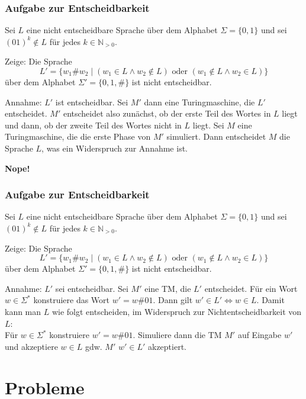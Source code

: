 

\begin{frame}
	\frametitle{Aufgabe zur Entscheidbarkeit}
	
	Sei $L$ eine nicht entscheidbare Sprache \"uber dem Alphabet $\Sigma=\{0,1\}$ und sei $(01)^k \not\in L$ f\"ur jedes $k\in \mathbb N_{>0}$.
	
Zeige: Die Sprache \[L' = \{w_1\#w_2\mid (w_1 \in L \wedge w_2 \not\in L) \text{ oder } (w_1 \not\in L \wedge w_2 \in L) \}\]
\"uber dem Alphabet $\Sigma'=\{0, 1, \#\}$ ist nicht entscheidbar.

	\invincible \pause
	
	\ducttape{1cm}	
	
Annahme: $L'$ ist entscheidbar. Sei $M'$ dann eine Turingmaschine, die $L'$ entscheidet. $M'$ entscheidet also zun\"achst, ob der erste Teil des Wortes in $L$ liegt und dann, ob der zweite Teil des Wortes nicht in $L$ liegt.
Sei $M$ eine Turingmaschine, die die erste Phase von $M'$ simuliert. Dann entscheidet $M$ die Sprache $L$, was ein Widerspruch zur Annahme ist.

	\pause
	
	\ducttape{1cm}
	\textbf{Nope!}
	
	\vincible
\end{frame}

\begin{frame}
	\frametitle{Aufgabe zur Entscheidbarkeit}
	Sei $L$ eine nicht entscheidbare Sprache \"uber dem Alphabet $\Sigma=\{0,1\}$ und sei $(01)^k \not\in L$ f\"ur jedes $k\in \mathbb N_{>0}$.
	
Zeige: Die Sprache \[L' = \{w_1\#w_2\mid (w_1 \in L \wedge w_2 \not\in L) \text{ oder } (w_1 \not\in L \wedge w_2 \in L) \}\]
\"uber dem Alphabet $\Sigma'=\{0, 1, \#\}$ ist nicht entscheidbar.

	\ducttape{1cm}	
	
	Annahme: $L'$ sei entscheidbar. 
Sei $M'$ eine TM, die $L'$ entscheidet.
F\"ur ein Wort $w \in \Sigma^*$ konstruiere das Wort $w'=w\#01$. 
Dann gilt $w' \in L' \Leftrightarrow w \in L$. 
Damit kann man $L$ wie folgt entscheiden, im Widerspruch zur Nichtentscheidbarkeit von $L$:\\
F\"ur $w \in \Sigma^*$ konstruiere $w'=w\#01$. Simuliere dann die TM $M'$ auf Eingabe $w'$ und akzeptiere $w \in L$ gdw. $M'$ $w' \in L'$ akzeptiert.
	
\end{frame}

\section{Probleme}
